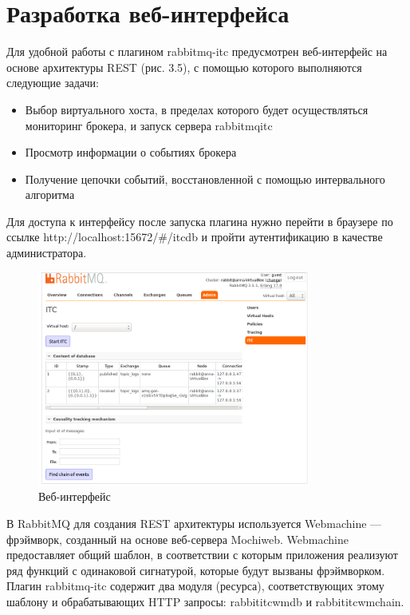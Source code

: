 {\section{Разработка веб-интерфейса}
Для удобной работы с плагином rabbitmq-itc предусмотрен веб-интерфейс  на основе архитектуры REST (рис. 3.5), с помощью которого выполняются следующие задачи:
\begin{itemize}
\item Выбор виртуального хоста, в пределах которого будет осуществляться мониторинг брокера, и запуск сервера rabbitmq\underline{\hspace{0.25cm}}itc
\item Просмотр информации о событиях брокера
\item Получение цепочки событий, восстановленной с помощью интервального алгоритма
\end{itemize}
Для доступа к интерфейсу после запуска плагина нужно перейти в браузере по ссылке  http://localhost:15672/\#/itc\underline{\hspace{0.25cm}}db и пройти аутентификацию в качестве администратора.

\begin{figure}
\centering
\includegraphics[width=0.8\textwidth]{img/web.png}
\caption{Веб-интерфейс}
\end{figure}
В RabbitMQ для создания REST архитектуры используется Webmachine --- фрэймворк, созданный на основе веб-сервера Mochiweb. Webmachine предоставляет общий шаблон, в соответствии с которым приложения реализуют ряд функций с одинаковой сигнатурой, которые будут вызваны фрэймворком. Плагин rabbitmq-itc содержит два модуля (ресурса), соответствующих этому шаблону и обрабатывающих HTTP запросы: rabbit\underline{\hspace{0.25cm}}itc\underline{\hspace{0.25cm}}wm\underline{\hspace{0.25cm}}db и rabbit\underline{\hspace{0.25cm}}itc\underline{\hspace{0.25cm}}wm\underline{\hspace{0.25cm}}chain.

}
